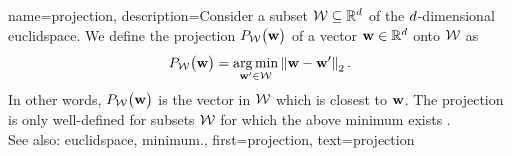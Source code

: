  {name={projection}, 
       description={Consider a subset $\mathcal{W} \subseteq \mathbb{R}^{d}$ of 
	   the $d$-dimensional \gls{euclidspace}. We define the projection $P_{\mathcal{W}}\big( {\bf w}\big)$
	   of a vector ${\bf w} \in \mathbb{R}^{d}$ onto $\mathcal{W}$ as
	   \begin{equation} 
   	   	\label{equ_def_proj_generic_dict}
  	    	P_{\mathcal{W}}\big( {\bf w}\big) = \operatorname*{arg\,min}_{{\bf w}' \in \mathcal{W}} \left\Vert {{\bf w}- {\bf w}'} \right\Vert_{2}. 
        	    \end{equation}
	    In other words, $P_{\mathcal{W}}\big( {\bf w}\big)$ is the vector in $\mathcal{W}$ 
	    which is closest to ${\bf w}$. The projection is only well-defined for subsets $\mathcal{W}$ 
	    for which the above \gls{minimum} exists \cite{BoydConvexBook}.
		 			\\ 
	    See also: \gls{euclidspace}, \gls{minimum}.},
	first={projection},
	text={projection}
}


